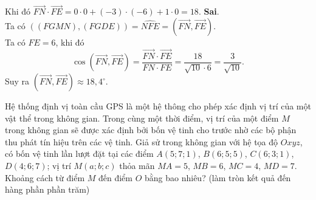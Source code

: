 \begin{ex}
{\begin{itemchoice}
			Khi đó $\overrightarrow{FN}\cdot\overrightarrow{FE}=0\cdot 0 + (-3)\cdot(-6) + 1 \cdot 0 = 18$.
			\itemch \textbf{Sai}.\\
			Ta có $\left((FGMN),(FGDE)\right)=\widehat{NFE}=\left(\overrightarrow{FN},\overrightarrow{FE}\right)$.\\
			Ta có $FE=6$, khi đó\\
			$$ \cos\left(\overrightarrow{FN},\overrightarrow{FE}\right)=\dfrac{\overrightarrow{FN}\cdot\overrightarrow{FE}}{FN\cdot FE} =\dfrac{18}{\sqrt{10}\cdot6}=\dfrac{3}{\sqrt{10}}.$$
			Suy ra $\left(\overrightarrow{FN},\overrightarrow{FE}\right)\approx 18{,}4^\circ$.
		\end{itemchoice}
	}
\end{ex}

\begin{bt}%
	Hệ thống định vị toàn cầu GPS là một hệ thông cho phép xác định vị trí của một vật thể trong không gian. Trong cùng một thời điểm, vị trí của một điểm $M$ trong không gian sẽ được xác định bởi bốn vệ tinh cho trước nhờ các bộ phận thu phát tín hiệu trên các vệ tinh. Giả sử trong không gian với hệ tọa độ $Oxyz$, có bốn vệ tinh lần lượt đặt tại các điểm $A(5; 7; 1)$, $B(6; 5; 5)$, $C(6; 3; 1)$, $D(4; 6; 7)$; vị trí $M(a; b; c)$ thỏa mãn $MA=5$, $MB=6$, $MC=4$, $MD=7$. Khoảng cách từ điểm $M$ đến điểm $O$ bằng bao nhiêu? (làm tròn kết quả đến hàng phần phần trăm)
\end{bt}

